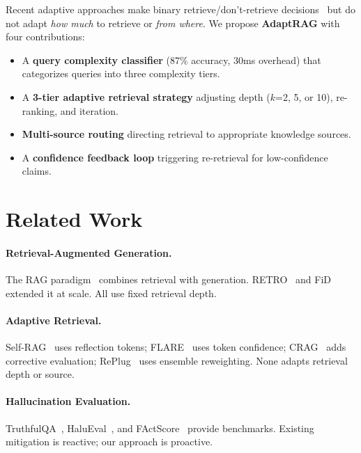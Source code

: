 \documentclass[11pt]{article}
\begin{document}
Recent adaptive approaches make binary retrieve/don't-retrieve decisions~\citep{Asai2024SelfRAG,Jiang2023FLARE,Yan2024CRAG} but do not adapt \emph{how much} to retrieve or \emph{from where}. We propose \textbf{AdaptRAG} with four contributions:

\begin{itemize}
    \item A \textbf{query complexity classifier} (87\% accuracy, 30ms overhead) that categorizes queries into three complexity tiers.
    \item A \textbf{3-tier adaptive retrieval strategy} adjusting depth ($k$=2, 5, or 10), re-ranking, and iteration.
    \item \textbf{Multi-source routing} directing retrieval to appropriate knowledge sources.
    \item A \textbf{confidence feedback loop} triggering re-retrieval for low-confidence claims.
\end{itemize}

\section{Related Work}

\paragraph{Retrieval-Augmented Generation.} The RAG paradigm~\citep{Lewis2020RAG} combines retrieval with generation. RETRO~\citep{Borgeaud2022RETRO} and FiD~\citep{Izacard2021FiD} extended it at scale. All use fixed retrieval depth.

\paragraph{Adaptive Retrieval.} Self-RAG~\citep{Asai2024SelfRAG} uses reflection tokens; FLARE~\citep{Jiang2023FLARE} uses token confidence; CRAG~\citep{Yan2024CRAG} adds corrective evaluation; RePlug~\citep{Shi2024RePlug} uses ensemble reweighting. None adapts retrieval depth or source.

\paragraph{Hallucination Evaluation.} TruthfulQA~\citep{Lin2022TruthfulQA}, HaluEval~\citep{Li2023HaluEval}, and FActScore~\citep{Min2023FActScore} provide benchmarks. Existing mitigation is reactive; our approach is proactive.
\end{document}
